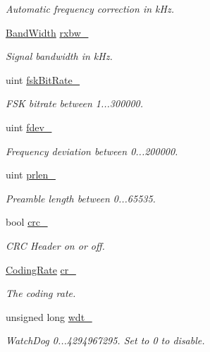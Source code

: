 \begin{DoxyCompactItemize}
\begin{DoxyCompactList}\small\item\em Automatic frequency correction in k\+Hz. \end{DoxyCompactList}\item 
\hyperlink{classo_cpt_1_1_lo_ra_abb27d22a584625eea0339906152c031d}{Band\+Width} \hyperlink{classo_cpt_1_1_lo_ra_ad82916e0708ce81df40be3a264446c94}{rxbw\+\_\+}
\begin{DoxyCompactList}\small\item\em Signal bandwidth in k\+Hz. \end{DoxyCompactList}\item 
uint \hyperlink{classo_cpt_1_1_lo_ra_ae8fc701f0418461263bc0049e95ab01e}{fsk\+Bit\+Rate\+\_\+}
\begin{DoxyCompactList}\small\item\em F\+SK bitrate between 1...300000. \end{DoxyCompactList}\item 
uint \hyperlink{classo_cpt_1_1_lo_ra_ac0a2434f4fd5275771f56c810aa3fbed}{fdev\+\_\+}
\begin{DoxyCompactList}\small\item\em Frequency deviation between 0...200000. \end{DoxyCompactList}\item 
uint \hyperlink{classo_cpt_1_1_lo_ra_a93c4923a8c79b33788d998cca5b764f8}{prlen\+\_\+}
\begin{DoxyCompactList}\small\item\em Preamble length between 0...65535. \end{DoxyCompactList}\item 
bool \hyperlink{classo_cpt_1_1_lo_ra_af6a4412b761252d2ef9b55c22ad2ef8e}{crc\+\_\+}
\begin{DoxyCompactList}\small\item\em C\+RC Header on or off. \end{DoxyCompactList}\item 
\hyperlink{classo_cpt_1_1_lo_ra_a9bbdbc3b6fefdabd52bbb3ebbebcee7a}{Coding\+Rate} \hyperlink{classo_cpt_1_1_lo_ra_a61d7ff909c4e40b48a8722ec0e608b2a}{cr\+\_\+}
\begin{DoxyCompactList}\small\item\em The coding rate. \end{DoxyCompactList}\item 
unsigned long \hyperlink{classo_cpt_1_1_lo_ra_aef791d801da3a184f574bb5dcf465bd3}{wdt\+\_\+}
\begin{DoxyCompactList}\small\item\em Watch\+Dog 0...4294967295. Set to 0 to disable. \end{DoxyCompactList}\item 

\end{DoxyCompactItemize}
